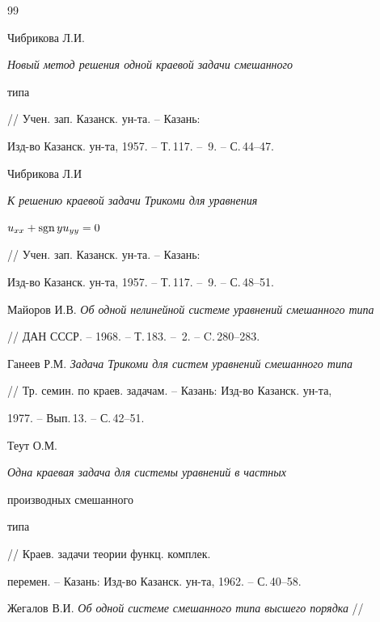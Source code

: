 \begin{thebibliography}{99}










Чибрикова Л.И. {\em Новый метод решения одной краевой задачи смешанного 


типа} // Учен. зап. Казанск. ун-та. -- Казань:


Изд-во Казанск. ун-та, 1957. -- Т.\,117. -- \No\,9. -- С.\,44--47.







Чибрикова Л.И {\em К решению краевой задачи Трикоми для уравнения


$u_{xx} + \operatorname{sgn} y u_{yy}=0$} // Учен. зап. Казанск. ун-та. -- Казань:


Изд-во Казанск. ун-та, 1957. -- Т.\,117. -- \No\,9. -- С.\,48--51.







Майоров И.В. {\em Об одной нелинейной системе уравнений смешанного типа}


// ДАН СССР. -- 1968. -- Т.\,183. -- \No\,2. -- C.\,280--283.







Ганеев Р.М. {\em Задача Трикоми для систем уравнений смешанного типа}


// Тр. семин. по краев. задачам. -- Казань: Изд-во Казанск. ун-та, 


1977. -- Вып.\,13. -- С.\,42--51.







Теут О.М. {\em Одна краевая задача для системы уравнений в частных


производных смешанного 


типа} // Краев. задачи теории функц. комплек.


перемен. -- Казань: Изд-во Казанск. ун-та, 1962. -- С.\,40--58.







Жегалов В.И. {\em Об одной системе смешанного типа высшего порядка} //



\end{thebibliography}
